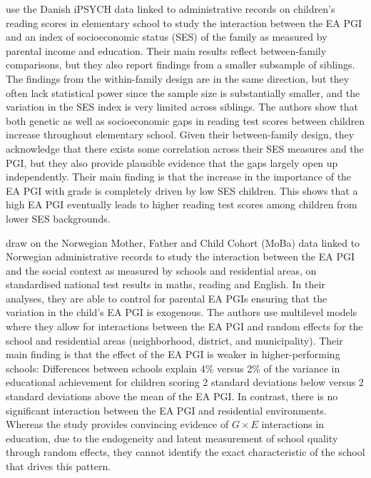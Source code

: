 \documentclass[12pt,a4paper]{article}
\begin{document}
\begin{bibunit}
\citet{houmark2022genetic} use the Danish iPSYCH data linked to administrative records on children's reading scores in elementary school to study the interaction between the EA PGI and an index of socioeconomic status (SES) of the family as measured by parental income and education. Their main results reflect between-family comparisons, but they also report findings from a smaller subsample of siblings. The findings from the within-family design are in the same direction, but they often lack statistical power since the sample size is substantially smaller, and the variation in the SES index is very limited across siblings. The authors show that both genetic as well as socioeconomic gaps in reading test scores between children increase throughout elementary school. Given their between-family design, they acknowledge that there exists some correlation across their SES measures and the PGI, but they also provide plausible evidence that the gaps largely open up independently. Their main finding is that the increase in the importance of the EA PGI with grade is completely driven by low SES children. This shows that a high EA PGI eventually leads to higher reading test scores among children from lower SES backgrounds. 

\citet{cheesman2022genes} draw on the Norwegian Mother, Father and Child Cohort (MoBa) data linked to Norwegian administrative records to study the interaction between the EA PGI and the social context as measured by schools and residential areas, on standardised national test results in maths, reading and English. In their analyses, they are able to control for parental EA PGIs ensuring that the variation in the child's EA PGI is exogenous. The authors use multilevel models where they allow for interactions between the EA PGI and random effects for the school and residential areas (neighborhood, district, and municipality). Their main finding is that the effect of the EA PGI is weaker in higher-performing schools: Differences between schools explain 4\% versus 2\% of the variance in educational achievement for children scoring 2 standard deviations below versus 2 standard deviations above the mean of the EA PGI. In contrast, there is no significant interaction between the EA PGI and residential environments. Whereas the study provides convincing evidence of $G \times E$ interactions in education, due to the endogeneity and latent measurement of school quality through random effects, they cannot identify the exact characteristic of the school that drives this pattern. 


\end{bibunit}
\end{document}
